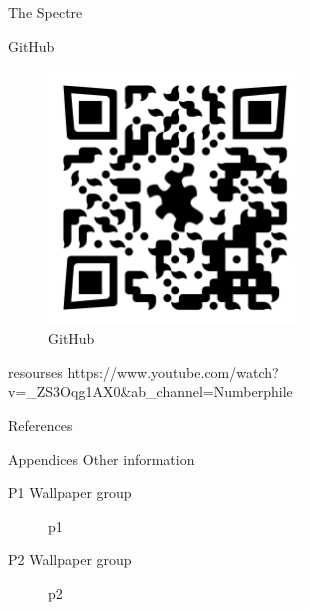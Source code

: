 \documentclass{beamer}
\theoremstyle{definition}
\begin{document}
\begin{frame}{The Spectre}
    
\end{frame}

\begin{frame}{GitHub}
    \begin{figure}
        \centering
        \includegraphics[width=0.6\textwidth]{images/qr-codes/tilling-presentation-github.png}
        \caption{GitHub}
        \label{fig:github-qrcode}
    \end{figure}
\end{frame}

\begin{frame}{resourses}
    https://www.youtube.com/watch?v=_ZS3Oqg1AX0&ab_channel=Numberphile
\end{frame}

\begin{frame}{References}
    
\end{frame}



\begin{frame}{Appendices}
    Other information
\end{frame}

\begin{frame}{P1 Wallpaper group}
    \begin{figure}
        \centering
        
        \caption{p1}
        \label{fig:p1}
    \end{figure}
\end{frame}

\begin{frame}{P2 Wallpaper group}
    \begin{figure}
        \centering
        
        \caption{p2}
        \label{fig:p2}
    \end{figure}
\end{frame}
\end{document}
